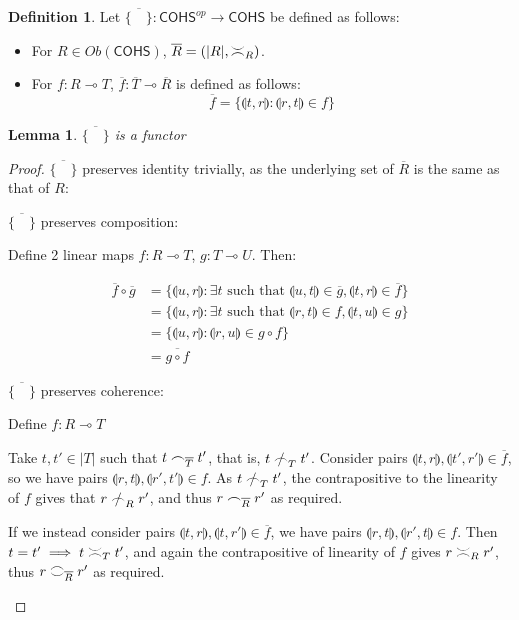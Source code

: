 \documentclass[12pt, oneside]{article}
\theoremstyle{plain}
\newtheorem{lemma}[theorem]{Lemma}
\theoremstyle{definition}
\newtheorem{definition}[theorem]{Definition}
\newcommand{\lp}{\llparenthesis}
\newcommand{\rp}{\rrparenthesis}
\newcommand{\cohs}{{\mathsf{COHS}}}
\newcommand{\coh}[1][]{\mathrel{\vcenter{\offinterlineskip\hbox{$\frown$}\vskip0.2ex\hbox{$\smile$}}_{\ifx\\#1\\\else#1\fi}}}
\newcommand{\incoh}[1][]{\mathrel{\vcenter{\offinterlineskip\hbox{$\smile$}\vskip0.2ex\hbox{$\frown$}}_{\ifx\\#1\\\else#1\fi}}}
\newcommand{\scoh}[1][]{\mathrel{\frown}_{\ifx\\#1\\\else#1\fi}}
\newcommand{\notscoh}[1][]{\mathrel{\ooalign{$\frown$\cr\hidewidth$/$\hidewidth}}_{\ifx\\#1\\\else#1\fi}}
\newcommand{\comp}{\mathbin{\circ}}
\begin{document}
\begin{definition}
    Let $\overline{\{\quad\}}:\cohs^{op}\to\cohs$ be defined as follows:
    \begin{itemize}
        \item
        For $R\in Ob(\cohs)$, $\overline{R}=(|R|,\incoh[R])$.

        \item
        For $f:R\multimap T$, $\overline{f}:\overline{T}\multimap\overline{R}$ is defined as follows:
        $$\overline{f}=\{\lp t,r\rp:\lp r,t\rp\in f\}$$
    \end{itemize}
\end{definition}

\begin{lemma}
    $\overline{\{\quad\}}$ is a functor
\end{lemma}

\begin{proof}
    $\overline{\{\quad\}}$ preserves identity trivially, as the underlying set of $\overline{R}$ is the same as that of $R$:

    $\overline{\{\quad\}}$ preserves composition:
    \begin{adjustwidth}{1.5em}{}
        Define 2 linear maps $f:R\multimap T$, $g:T\multimap U$. Then:
    \end{adjustwidth}
    \begin{align*}
        \overline{f}\comp\overline{g} &= \{\lp u,r\rp:\exists t \text{ such that } \lp u,t\rp\in \overline{g},\lp t,r\rp\in \overline{f}\} \\
        &= \{\lp u,r\rp:\exists t \text{ such that } \lp r,t\rp\in f,\lp t,u\rp\in g\} \\
        &= \{\lp u,r\rp:\lp r,u\rp\in g\comp f\} \\
        &= \overline{g\comp f}
    \end{align*}

    $\overline{\{\quad\}}$ preserves coherence:
    \begin{adjustwidth}{1.5em}{}
        Define $f:R\multimap T$

        Take $t,t'\in|T|$ such that $t\scoh[\overline{T}]t'$, that is, $t\notscoh[T]t'$.
        Consider pairs $\lp t,r\rp,\lp t',r'\rp\in\overline{f}$, so we have pairs $\lp r,t\rp,\lp r',t'\rp\in f$.
        As $t\notscoh[T]t'$, the contrapositive to the linearity of $f$ gives that $r\notscoh[R]r'$, and thus $r\scoh[\overline{R}]r'$ as required.

        If we instead consider pairs $\lp t,r\rp,\lp t,r'\rp\in\overline{f}$, we have pairs $\lp r,t\rp,\lp r',t\rp\in f$.
        Then $t=t'\implies t\incoh[T]t'$, and again the contrapositive of linearity of $f$ gives $r\incoh[R]r'$, thus $r\coh[\overline{R}]r'$ as required.

    \end{adjustwidth}

\end{proof}
\end{document}
